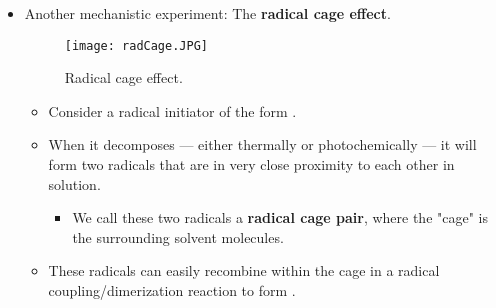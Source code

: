 \documentclass[../notes.tex]{subfiles}
\begin{document}
\begin{itemize}
\begin{itemize}
        \item Method: Synthesize an analogue of your substrate with a certain functional group attached such that if a radical is formed at a certain site, it will react with your new functional group instead of doing the designed reactivity.
        \item Example: Enable the formation of a 5-hexenyl radical so that it can do a \textbf{5-exo-trig cyclization}.\footnote{This is a type of radical cyclization allowed by Baldwin's rules.}
        \begin{itemize}
            \item The rate of this reaction is $k=\SI{2.3e5}{\per\second}$.
        \end{itemize}
        \item Example: Enable the formation of a cyclopropylmethyl radical so that it can do a radical ring opening and form an olefin.
        \begin{itemize}
            \item The rate of this reaction is even quicker: $k=\SI{9.4e7}{\per\second}$.
            \item This is gold standard for a mechanistic experiment to prove radical mechanisms.
        \end{itemize}
        \item These are very common kinetic probes for mechanisms!
    \end{itemize}
    \item Another mechanistic experiment: The \textbf{radical cage effect}.
    \begin{figure}[h!]
        \centering
        \texttt{[image: radCage.JPG]}
        \caption{Radical cage effect.}
        \label{fig:radCage}
    \end{figure}
    \begin{itemize}
        \item Consider a radical initiator of the form .
        \item When it decomposes --- either thermally or photochemically --- it will form two radicals that are in very close proximity to each other in solution.
        \begin{itemize}
            \item We call these two radicals a \textbf{radical cage pair}, where the "cage" is the surrounding solvent molecules.
        \end{itemize}
        \item These radicals can easily recombine within the cage in a radical coupling/dimerization reaction to form .

\end{itemize}
\end{itemize}
\end{document}
